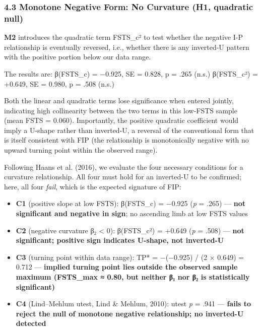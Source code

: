 \documentclass[12pt,a4paper]{article}
\providecommand{\tightlist}{\setlength{\itemsep}{0pt}\setlength{\parskip}{0pt}}
\begin{document}
\hypertarget{43-monotone-negative-form-no-curvature-h1-quadratic-null}{%
\subsubsection{4.3 Monotone Negative Form: No Curvature (H1, quadratic
null)}\label{43-monotone-negative-form-no-curvature-h1-quadratic-null}}

\textbf{M2} introduces the quadratic term FSTS\_c² to test whether the
negative I-P relationship is eventually reversed, i.e., whether there is
any inverted-U pattern with the positive portion below our data range.

The results are: β(FSTS\_c) = −0.925, SE = 0.828, p = .265 (n.s.)
β(FSTS\_c²) = +0.649, SE = 0.980, p = .508 (n.s.)

Both the linear and quadratic terms lose significance when entered
jointly, indicating high collinearity between the two terms in this
low-FSTS sample (mean FSTS = 0.060). Importantly, the positive quadratic
coefficient would imply a U-shape rather than inverted-U, a reversal of
the conventional form that is itself consistent with FIP (the
relationship is monotonically negative with no upward turning point
within the observed range).

Following Haans et al. (2016), we evaluate the four necessary conditions
for a curvature relationship. All four must hold for an inverted-U to be
confirmed; here, all four \emph{fail}, which is the expected signature
of FIP:

\begin{itemize}
\tightlist
\item
  \textbf{C1} (positive slope at low FSTS): β(FSTS\_c) = −0.925
  (\emph{p} = .265) --- \textbf{not significant and negative in sign};
  no ascending limb at low FSTS values
\item
  \textbf{C2} (negative curvature β₂ \textless{} 0): β(FSTS\_c²) =
  +0.649 (\emph{p} = .508) --- \textbf{not significant; positive sign
  indicates U-shape, not inverted-U}
\item
  \textbf{C3} (turning point within data range): TP* = −(−0.925) / (2 ×
  0.649) = 0.712 --- \textbf{implied turning point lies outside the
  observed sample maximum (FSTS\_max ≈ 0.80, but neither β₁ nor β₂ is
  statistically significant)}
\item
  \textbf{C4} (Lind--Mehlum utest, Lind \& Mehlum, 2010): utest \emph{p}
  = .941 --- \textbf{fails to reject the null of monotone negative
  relationship; no inverted-U detected}
\end{itemize}
\end{document}

